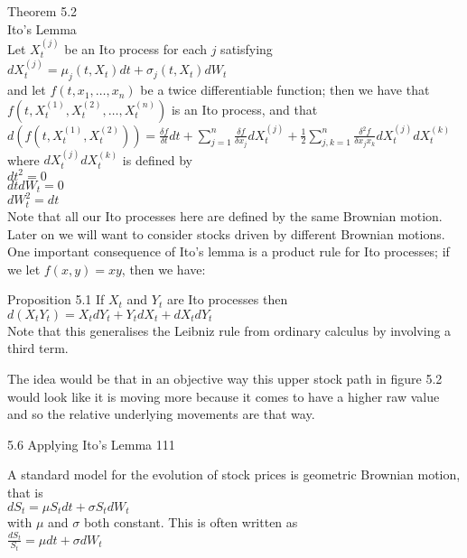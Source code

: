 Theorem 5.2 \\
Ito's Lemma \\
Let $X_t^{(j)}$ be an Ito process for each $j$ satisfying \\
$dX_t^{(j)} = \mu_j (t,X_t) dt + \sigma_j (t,X_t) dW_t$ \\
and let $f(t,x_1,\dots , x_n)$ be a twice differentiable function; then we have that $f(t,X_t^{(1)},X_t^{(2)},\dots ,X_t^{(n)})$ is an Ito process, and that \\
$d(f(t,X_t^{(1)},X_t^{(2)})) = \frac{\delta f}{\delta t}dt + \sum_{j=1}^n \frac{\delta f}{\delta x_j} dX_t^{(j)} + \frac{1}{2} \sum_{j,k=1}^n \frac{\delta^2 f}{\delta x_j x_k} dX_t^{(j)} dX_t^{(k)}$ \\
where $dX_t^{(j)} dX_t^{(k)}$ is defined by \\
$dt^2 = 0$ \\
$dt dW_t = 0$ \\
$dW_t^2 = dt$ \\
Note that all our Ito processes here are defined by the same Brownian motion. Later on we will want to consider stocks driven by different Brownian motions. One important consequence of Ito's lemma is a product rule for Ito processes; if we let $f(x,y)=xy$, then we have:

Proposition 5.1 If $X_t$ and $Y_t$ are Ito processes then \\
$d(X_t Y_t) = X_t dY_t + Y_t dX_t + dX_t dY_t$ \\
Note that this generalises the Leibniz rule from ordinary calculus by involving a third term.

The idea would be that in an objective way this upper stock path in figure 5.2 would look like it is moving more because it comes to have a higher raw value and so the relative underlying movements are that way.

5.6 Applying Ito's Lemma 111

A standard model for the evolution of stock prices is geometric Brownian motion, that is \\
$dS_t = \mu S_t dt + \sigma S_t dW_t$ \\
with $\mu$ and $\sigma$ both constant. This is often written as \\
$\frac{d S_t}{S_t} = \mu dt + \sigma dW_t$

